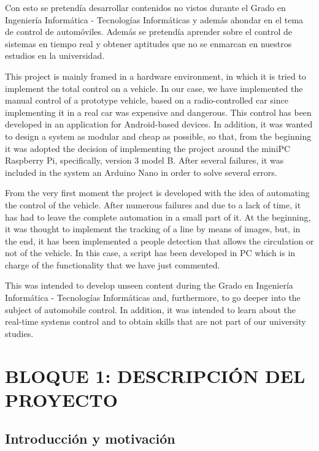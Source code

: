 \documentclass{pclass}
\begin{document}
Con esto se pretendía desarrollar contenidos no vistos durante el Grado en Ingeniería Informática - Tecnologías Informáticas y además ahondar en el tema de control de automóviles. Además se pretendía aprender sobre el control de sistemas en tiempo real y obtener aptitudes que no se enmarcan en nuestros estudios en la universidad.




This project is mainly framed in a hardware environment, in which it is tried to implement the total control on a vehicle. In our case, we have implemented the manual control of a prototype vehicle, based on a radio-controlled car since implementing it in a real car was expensive and dangerous. This control has been developed in an application for Android-based devices. In addition, it was wanted to design a system as modular and cheap as possible, so that, from the beginning it was adopted the decision of implementing the project
around the miniPC Raspberry Pi, specifically, version 3 model B. 
After several failures, it was included in the system an Arduino Nano in order to solve several errors.


From the very first moment the project is developed with the idea of automating the control of the vehicle. After numerous failures and due to a lack of time, it has had to leave the complete automation in a small part of it. At the beginning, it was thought to implement the tracking of a line by means of images, but, in the end, it has been implemented a people detection that allows the circulation or not of the vehicle. 
In this case, a script has been developed in PC which is in charge of the functionality that we have just commented.


This was intended to develop unseen content during the Grado en Ingeniería Informática - Tecnologías Informáticas and, furthermore, to go deeper into the subject of automobile control. 
In addition, it was intended to learn about the real-time systems control and to obtain skills that are not part of our university studies.


        
\tableofcontents


\listoffigures
\mainmatter  


\chapter{BLOQUE 1: DESCRIPCIÓN DEL PROYECTO}
\section{Introducción y motivación}
\end{document}
